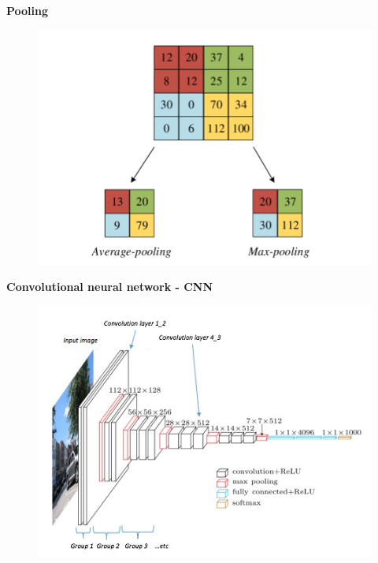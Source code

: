 \documentclass[xcolor=dvipsnames]{beamer}
\begin{document}
\begin{frame}{\bf Pooling}

\begin{figure}
  \includegraphics[scale=0.2]{../../diagrams/pooling.png}
\end{figure}

\end{frame}


\begin{frame}{\bf Convolutional neural network - CNN}

  \begin{figure}
    \includegraphics[scale=0.5]{../../diagrams/cnn.jpg}
  \end{figure}

\end{frame}
\end{document}

